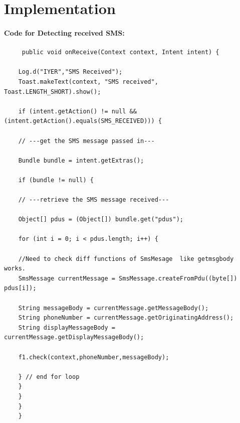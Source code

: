 \section{Implementation}

		\hspace{0.9cm}\paragraph{Code for Detecting received SMS:}
		\begin{verbatim}
	 public void onReceive(Context context, Intent intent) {
	
	Log.d("IYER","SMS Received");
	Toast.makeText(context, "SMS received", Toast.LENGTH_SHORT).show();
	
	if (intent.getAction() != null && (intent.getAction().equals(SMS_RECEIVED))) {
	
	// ---get the SMS message passed in---
	
	Bundle bundle = intent.getExtras();
	
	if (bundle != null) {
	
	// ---retrieve the SMS message received---
	
	Object[] pdus = (Object[]) bundle.get("pdus");
	
	for (int i = 0; i < pdus.length; i++) {
	
	//Need to check diff functions of SmsMesage  like getmsgbody works.
	SmsMessage currentMessage = SmsMessage.createFromPdu((byte[]) pdus[i]);
	
	String messageBody = currentMessage.getMessageBody();
	String phoneNumber = currentMessage.getOriginatingAddress();
	String displayMessageBody = currentMessage.getDisplayMessageBody();
	
	f1.check(context,phoneNumber,messageBody);
	
	} // end for loop
	}
	}
	}
	}
		\end{verbatim}
		
